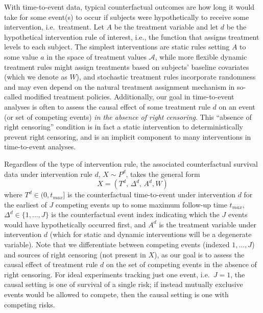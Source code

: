 With time-to-event data, typical counterfactual outcomes are how long it would take for some event(s) to occur if subjects were hypothetically to receive some intervention, i.e.~treatment. Let \(A\) be the treatment variable and let \(d\) be the hypothetical intervention rule of interest, i.e., the function that assigns treatment levels to each subject. The simplest interventions are static rules setting \(A\) to some value \(a\) in the space of treatment values \(\mathcal{A}\), while more flexible dynamic treatment rules might assign treatments based on subjects' baseline covariates (which we denote as \(W\)), and stochastic treatment rules incorporate randomness and may even depend on the natural treatment assignment mechanism in so-called modified treatment policies. Additionally, our goal in time-to-event analyses is often to assess the causal effect of some treatment rule \(d\) on an event (or set of competing events) \textit{in the absence of right censoring}. This ``absence of right censoring'' condition is in fact a static intervention to deterministically prevent right censoring, and is an implicit component to many interventions in time-to-event analyses.

Regardless of the type of intervention rule, the associated counterfactual survival data under intervention rule \(d\), \(X \sim P^d\), takes the general form \begin{equation}
 X = \left(T^d,\, \Delta^d,\, A^d, {W}\right) \label{causaldata}
\end{equation} where \(T^d \in (0, t_{max}]\) is the counterfactual time-to-event under intervention \(d\) for the earliest of \(J\) competing events up to some maximum follow-up time \(t_{max}\), \(\Delta^d \in \{1, \dots, J\}\) is the counterfactual event index indicating which the \(J\) events would have hypothetically occurred first, and \(A^d\) is the treatment variable under intervention \(d\) (which for static and dynamic interventions will be a degenerate variable). Note that we differentiate between competing events (indexed \(1, ..., J\)) and sources of right censoring (not present in \(X\)), as our goal is to assess the causal effect of treatment rule \(d\) on the set of competing events in the absence of right censoring. For ideal experiments tracking just one event, i.e.~\(J = 1\), the causal setting is one of survival of a single risk; if instead mutually exclusive events would be allowed to compete, then the causal setting is one with competing risks.

